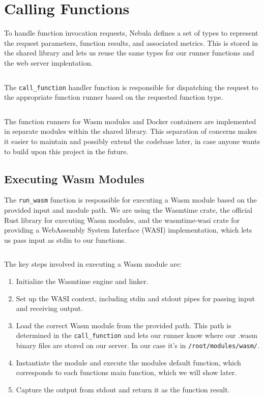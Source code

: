 \documentclass[
  table]{report}
\providecommand{\tightlist}{%
  \setlength{\itemsep}{0pt}\setlength{\parskip}{0pt}}
\begin{document}
\section{Calling Functions}

To handle function invocation requests, Nebula defines a set of types to
represent the request parameters, function results, and associated
metrics. This is stored in the shared library and lets us reuse the same
types for our runner functions and the web server implentation.

\inputminted{rust}{assets/code/nebula_types.rs}

The \texttt{call\_function} handler function is responsible for
dispatching the request to the appropriate function runner based on the
requested function type.

\inputminted{rust}{assets/code/call_function.rs}

The function runners for Wasm modules and Docker containers are
implemented in separate modules within the shared library. This
separation of concerns makes it easier to maintain and possibly extend
the codebase later, in case anyone wants to build upon this project in
the future.

\subsection{Executing \ac{Wasm} Modules}

The \texttt{run\_wasm} function is responsible for executing a Wasm
module based on the provided input and module path. We are using the
Wasmtime crate, the official Rust library for executing Wasm modules,
and the wasmtime-wasi crate for providing a WebAssembly System Interface
(WASI) implementation, which lets us pass input as stdin to our
functions.

\inputminted{rust}{assets/code/wasm_runner.rs}

The key steps involved in executing a Wasm module are:

\begin{enumerate}
\def\labelenumi{\arabic{enumi}.}
\tightlist
\item
  Initialize the Wasmtime engine and linker.
\item
  Set up the WASI context, including stdin and stdout pipes for passing
  input and receiving output.
\item
  Load the correct Wasm module from the provided path. This path is
  determined in the \texttt{call\_function} and lets our runner know
  where our .wasm binary files are stored on our server. In our case
  it's in \texttt{/root/modules/wasm/}.
\item
  Instantiate the module and execute the modules default function, which
  corresponds to each functions main function, which we will show later.
\item
  Capture the output from stdout and return it as the function result.
\end{enumerate}
\end{document}
